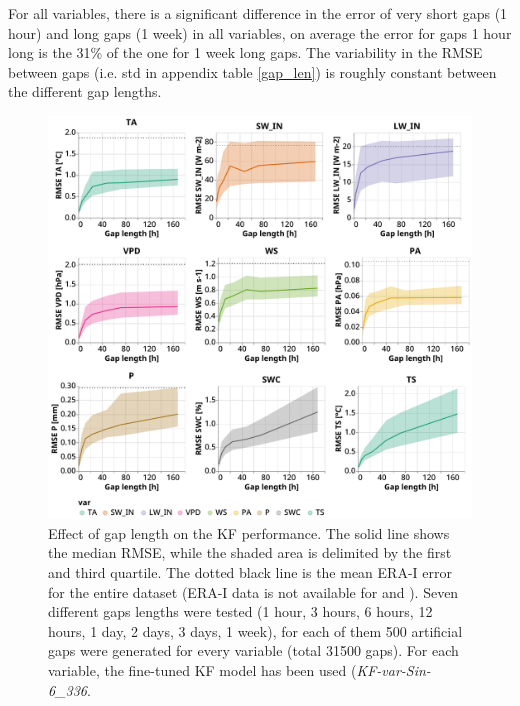 \documentclass{article}
\newcommand{\imgwidth}{6in}
\begin{document}
For all variables, there is a significant difference in the error of very short gaps (1 hour) and long gaps (1 week) in all variables, on average the error for gaps 1 hour long is the 31\% of the one for 1 week long gaps.
The variability in the RMSE between gaps (i.e. std in appendix table \ref{gap_len}) is roughly constant between the different gap lengths.




\begin{figure}
\centerline{\includegraphics[width=\imgwidth]{gap_len}}
\caption{Effect of gap length on the KF performance. The solid line shows the median RMSE, while the shaded area is delimited by the first and third quartile. The dotted black line is the mean ERA-I error for the entire dataset (ERA-I data is not available for  and ). Seven different gaps lengths were tested (1 hour, 3 hours, 6 hours, 12 hours, 1 day, 2 days, 3 days, 1 week), for each of them 500 artificial gaps were generated for every variable (total 31500 gaps). For each variable, the fine-tuned KF model has been used (\textit{KF-\textlangle var\textrangle-Sin-6\_336}.}
\label{fig:gap_len}
\end{figure}
\end{document}
